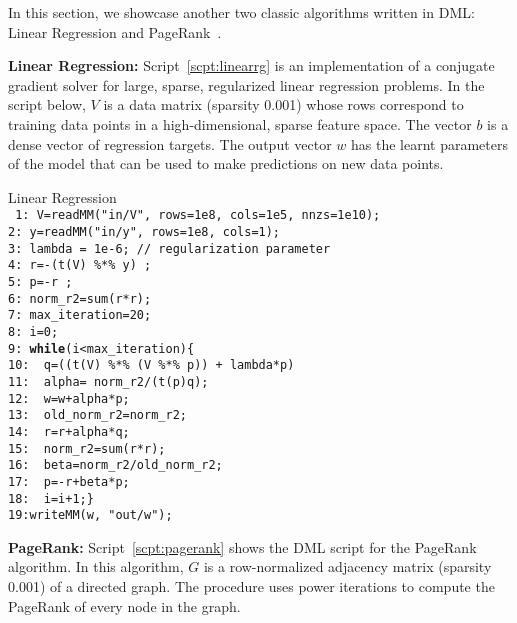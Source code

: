 In this section, we showcase another two classic algorithms written in DML: Linear Regression and PageRank~\cite{PageRank}. 

{\bf Linear Regression:} Script~\ref{scpt:linearrg} is an implementation of a conjugate gradient
solver for large, sparse, regularized linear regression problems. In the script below, $V$ is a data
matrix (sparsity 0.001) whose rows correspond to training data points in a high-dimensional, sparse
feature space. The vector $b$ is a dense vector of regression targets. The output vector $w$ has the
learnt parameters of the model that can be used to make predictions on new data points.

\vspace{0.25cm}
\begin{script}\label{scpt:linearrg}
Linear Regression\\
\footnotesize
\texttt{
1:\ V=readMM("in/V", rows=1e8, cols=1e5, nnzs=1e10);\\
2:\ y=readMM("in/y", rows=1e8, cols=1);\\
3:\ lambda  = 1e-6; // regularization parameter \\
4:\ r=-(t(V) \%*\% y) ;\\
5:\ p=-r ;\\
6:\ norm\_r2=sum(r*r);\\
7:\ max\_iteration=20;\\
8:\ i=0;\\
9:\ \textbf{while}(i<max\_iteration)\{\\
10:\ \ q=((t(V) \%*\% (V \%*\% p)) + lambda*p) \\
11:\ \ alpha= norm\_r2/(t(p)\mmult q);\\
12:\ \ w=w+alpha*p;\\
13:\ \ old\_norm\_r2=norm\_r2;\\
14:\ \ r=r+alpha*q;\\
15:\ \ norm\_r2=sum(r*r);\\
16:\ \ beta=norm\_r2/old\_norm\_r2; \\
17:\ \ p=-r+beta*p;\\
18:\ \ i=i+1;\}\\
19:writeMM(w, "out/w");}
\end{script}
\vspace{0.25cm}

{\bf PageRank:} Script~\ref{scpt:pagerank} shows the DML script for the PageRank algorithm. In
this algorithm, $G$ is a row-normalized adjacency matrix (sparsity 0.001) of a directed graph.  The
procedure uses power iterations to compute the PageRank of every node in the graph.

